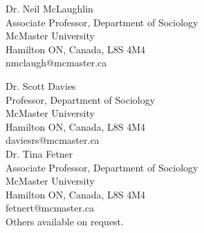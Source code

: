 \documentclass[11pt,usenames,dvipsnames]{article}
\begin{document}


\noindent Dr. Neil McLaughlin\\
Associate Professor, Department of Sociology\\
McMaster University\\
Hamilton ON, Canada, L8S 4M4\\
nmclaugh@mcmaster.ca\\

\bigskip

\noindent Dr. Scott Davies\\
Professor, Department of Sociology\\
McMaster University\\
Hamilton ON, Canada, L8S 4M4\\
daviesrs@mcmaster.ca\\

\noindent Dr. Tina Fetner\\
Associate Professor, Department of Sociology\\
McMaster University\\
Hamilton ON, Canada, L8S 4M4\\
fetnert@mcmaster.ca\\

\noindent Others available on request.\\
\end{document}

